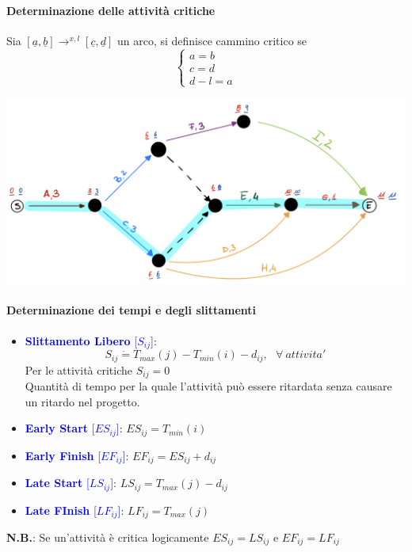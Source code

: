 \documentclass[12pt,a4paper]{article}
\begin{document}
\paragraph{Determinazione delle attività critiche}
Sia $ [\underline{a}, \underline{b}] \longrightarrow^{x,l} [\underline{c}, \underline{d}]$ un arco, si definisce cammino critico se \begin{equation*}
\begin{cases}
a=b\\
c=d\\
d-l = a
\end{cases}
\end{equation*}
\begin{center}
\includegraphics[width=0.4\columnwidth]{img/cpm_cammino_critico.jpg}
\end{center}

\paragraph{Determinazione dei tempi e degli slittamenti}
\begin{itemize}
\item \textcolor{blue}{\textbf{Slittamento Libero} [$S_{ij}$]}:
$$S_{ij} \dot = T_{max}(j) - T_{min}(i) - d_{ij}, \ \ \ \forall\ attivita'$$
Per le attività critiche $S_{ij} = 0$\\
Quantità di tempo per la quale l'attività può essere ritardata senza causare un ritardo nel progetto.\\
\item \textcolor{blue}{\textbf{Early Start} [$ES_{ij}$]}: $ES_{ij} = T_{min}(i)$\\
\item \textcolor{blue}{\textbf{Early Finish} [$EF_{ij}$]}: $EF_{ij} = ES_{ij} + d_{ij}$\\
\item \textcolor{blue}{\textbf{Late Start} [$LS_{ij}$]}: $LS_{ij} = T_{max}(j)-d_{ij}$\\
\item \textcolor{blue}{\textbf{Late FInish} [$LF_{ij}$]}: $LF_{ij} = T_{max}(j)$\\
\end{itemize}
\textbf{N.B.}: Se un'attività è critica logicamente $ES_{ij} = LS_{ij}$ e $EF_{ij} = LF_{ij}$
\end{document}
